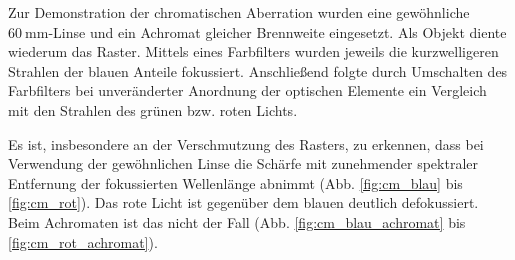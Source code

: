 Zur Demonstration der chromatischen Aberration wurden eine gewöhnliche $\SI{60}{\milli\meter}$-Linse und ein Achromat gleicher Brennweite eingesetzt. Als Objekt diente wiederum das Raster. Mittels eines Farbfilters wurden jeweils die kurzwelligeren Strahlen der blauen Anteile fokussiert. Anschließend folgte durch Umschalten des Farbfilters bei unveränderter Anordnung der optischen Elemente ein Vergleich mit den Strahlen des grünen bzw. roten Lichts.

Es ist, insbesondere an der Verschmutzung des Rasters, zu erkennen, dass bei Verwendung der gewöhnlichen Linse die Schärfe mit zunehmender spektraler Entfernung der fokussierten Wellenlänge abnimmt (Abb. \ref{fig:cm_blau} bis \ref{fig:cm_rot}). Das rote Licht ist gegenüber dem blauen deutlich defokussiert. Beim Achromaten ist das nicht der Fall (Abb. \ref{fig:cm_blau_achromat} bis \ref{fig:cm_rot_achromat}).

